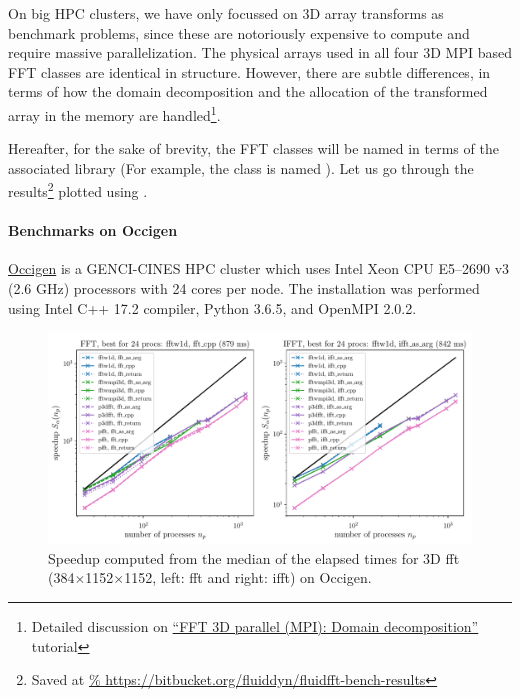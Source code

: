 On big HPC clusters, we have only focussed on 3D array transforms as benchmark
problems, since these are notoriously expensive to compute and require massive
parallelization.  The physical arrays used in all four 3D MPI based FFT classes
are identical in structure.  However, there are subtle differences, in terms of
how the domain decomposition and the allocation of the transformed array in the
memory are handled\footnote{Detailed discussion on \href{%
https://fluidfft.readthedocs.io/en/latest/ipynb/executed/tuto_fft3d_mpi_domain_decomp.html}{%
``FFT 3D parallel (MPI): Domain decomposition''} tutorial}.

Hereafter, for the sake of brevity, the FFT classes will be named in terms of the
associated library (For example, the class  is
named ).  Let us go through the results\footnote{Saved at
\url{%
https://bitbucket.org/fluiddyn/fluidfft-bench-results}} plotted using
.

\paragraph{Benchmarks on Occigen}

\href{https://www.top500.org/system/178465}{Occigen} is a GENCI-CINES HPC
cluster which uses Intel Xeon CPU E5--2690 v3 (2.6 GHz) processors with 24 cores
per node. The installation was performed using Intel C++ 17.2 compiler, Python
3.6.5, and OpenMPI 2.0.2.

\begin{figure}[htp!]
\centering
\includegraphics[width=\linewidth]{tmp/fig_occigen_384x1152x1152}
\caption{Speedup computed from the median of the elapsed times for 3D fft
(384$\times$1152$\times$1152, left: fft and right: ifft) on Occigen.}%
\label{fig:occigen384x1152x1152}
\end{figure}

